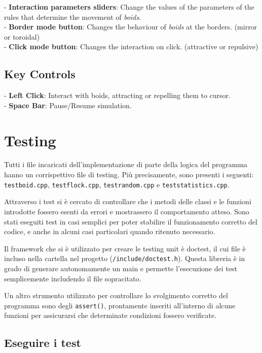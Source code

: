 \documentclass[10pt,a4paper]{article}
\begin{document}
- \textbf{Interaction parameters sliders}: Change the values of the parameters of the rules that determine the movement of \textit{boids}. \\
- \textbf{Border mode button}: Changes the behaviour of \textit{boids} at the borders. (mirror or toroidal) \\
- \textbf{Click mode button}: Changes the interaction on click. (attractive or repulsive)

\subsection{Key Controls}

- \textbf{Left Click}: Interact with boids, attracting or repelling them to cursor. \\
- \textbf{Space Bar}: Pause/Resume simulation.

\newpage

\section{Testing}

Tutti i file incaricati dell'implementazione di parte della logica del programma hanno un corrispettivo file di testing. Più precisamente, sono presenti i seguenti: \texttt{testboid.cpp}, \texttt{testflock.cpp}, \texttt{testrandom.cpp} e \texttt{teststatistics.cpp}. 

Attraverso i test si è cercato di controllare che i metodi delle classi e le funzioni introdotte fossero esenti da errori e mostrassero il comportamento atteso. Sono stati eseguiti test in casi semplici per poter stabilire il funzionamento corretto del codice, e anche in alcuni casi particolari quando ritenuto necessario.

Il framework che si è utilizzato per creare le testing unit è doctest, il cui file è incluso nella cartella nel progetto (\texttt{/include/doctest.h}). Questa libreria è in grado di generare autonomamente un main e permette l'esecuzione dei test semplicemente includendo il file sopracitato.

Un altro strumento utilizzato per controllare lo svolgimento corretto del programma sono degli \texttt{assert()}, prontamente inseriti all'interno di alcune funzioni per assicurarsi che determinate condizioni fossero verificate.

\subsection{Eseguire i test}
\end{document}
